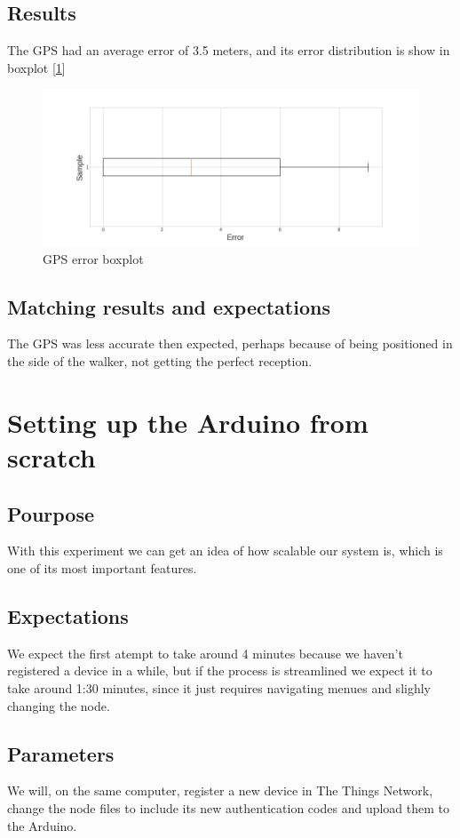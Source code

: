 	\subsection{Results}
		The GPS had an average error of 3.5 meters, and its error distribution is show in boxplot [\ref{fig:gps_plot}]

		\begin{figure}[h]
			\centering
			\includegraphics[width=1.2\linewidth]{gfx/gps_boxplot_error}
			\caption{GPS error boxplot}
			\label{fig:gps_plot}
		\end{figure}

	\subsection{Matching results and expectations}
		The GPS was less accurate then expected, perhaps because of being positioned in the side of the walker, not getting the perfect reception.

\section{Setting up the Arduino from scratch}

	\subsection{Pourpose}
		With this experiment we can get an idea of how scalable our system is, which is one of its most important features.
	\subsection{Expectations}
		We expect the first atempt to take around 4 minutes because we haven't registered a device in a while, but if the process is streamlined we expect it to take around 1:30 minutes, since it just requires navigating menues and slighly changing the node.
	\subsection{Parameters}
		We will, on the same computer, register a new device in The Things Network, change the node files to include its new authentication codes and upload them to the Arduino.
